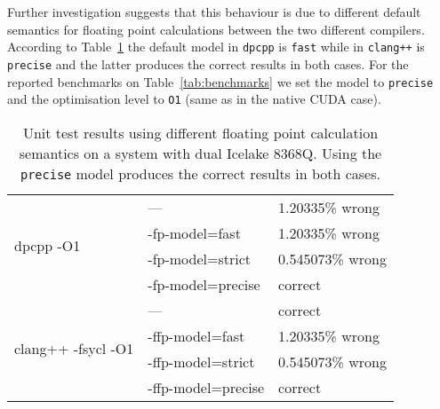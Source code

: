 \documentclass[../main]{subfiles}
\begin{document}
Further investigation suggests that this behaviour is due to different default semantics for floating point calculations between the two different compilers.
According to Table~\ref{tab:semantics} the default model in \texttt{dpcpp} is \texttt{fast} while in \texttt{clang++} is \texttt{precise} and the latter produces the correct results in both cases.
For the reported benchmarks on Table~\ref{tab:benchmarks} we set the model to \texttt{precise} and the optimisation level to \texttt{O1} (same as in the native CUDA case).

\begin{center}
	\begin{table}
		\centering
		\begin{tabular}{||ll|l||}
			\hline
			\multirow{4}{*}{dpcpp -O1}          & ---                & 1.20335\% wrong  \\
			                                    & -fp-model=fast     & 1.20335\% wrong  \\
			                                    & -fp-model=strict   & 0.545073\% wrong \\
			                                    & -fp-model=precise  & correct          \\ \hline \hline
			\multirow{4}{*}{clang++ -fsycl -O1} & ---                & correct          \\
			                                    & -ffp-model=fast    & 1.20335\% wrong  \\
			                                    & -ffp-model=strict  & 0.545073\% wrong \\
			                                    & -ffp-model=precise & correct          \\ \hline
		\end{tabular}
		\caption{\label{tab:semantics}Unit test results using different floating point calculation semantics on a system with dual Icelake 8368Q. Using the \texttt{precise} model produces the correct results in both cases.}
	\end{table}
\end{center}
\end{document}
